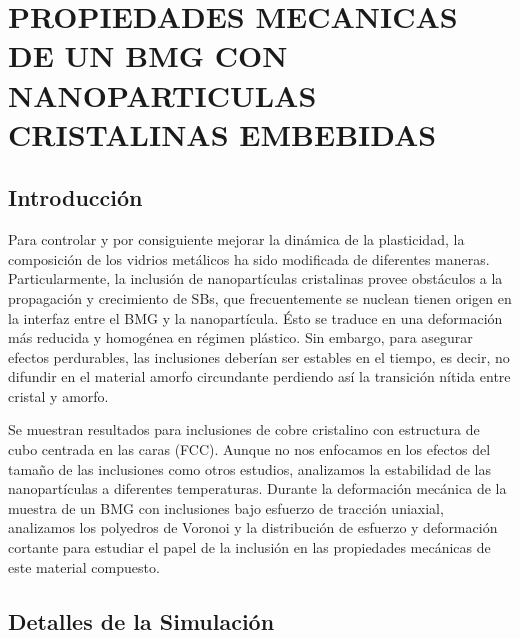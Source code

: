 
\chapter{PROPIEDADES MECANICAS DE UN BMG CON NANOPARTICULAS CRISTALINAS EMBEBIDAS} %

\label{C4} %



\section{Introducción}

Para controlar y por consiguiente mejorar la dinámica de la plasticidad, la composición de los vidrios metálicos ha sido modificada de diferentes maneras. Particularmente, la inclusión de nanopartículas cristalinas provee obstáculos a la propagación y crecimiento de SBs, que frecuentemente se nuclean tienen origen en la interfaz entre el BMG y la nanopartícula. Ésto se traduce en una deformación más reducida y homogénea en régimen plástico. Sin embargo, para asegurar efectos perdurables, las inclusiones deberían ser estables en el tiempo, es decir, no difundir en el material amorfo circundante perdiendo así la transición nítida entre cristal y amorfo.

Se muestran resultados para inclusiones de cobre cristalino con estructura de cubo centrada en las caras (FCC). Aunque no nos enfocamos en los efectos del tamaño de las inclusiones como otros estudios, analizamos la estabilidad de las nanopartículas a diferentes temperaturas. Durante la deformación mecánica de la muestra de un BMG con inclusiones bajo esfuerzo de tracción uniaxial, analizamos los polyedros de Voronoi y la distribución de esfuerzo y deformación cortante para estudiar el papel de la inclusión en las propiedades mecánicas de este material compuesto.

\section{Detalles de la Simulación}

